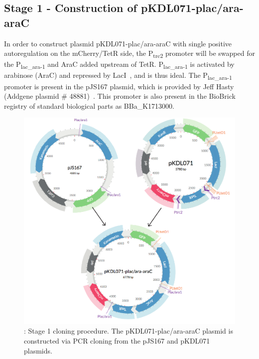 \subsection{Stage 1 - Construction of pKDL071-plac/ara-araC}

In order to construct plasmid pKDL071-plac/ara-araC with single positive autoregulation on the mCherry/TetR side, the P\textsubscript{trc2} promoter will be swapped for the P\textsubscript{lac\_ara-1} and AraC added upstream of TetR. P\textsubscript{lac\_ara-1} is activated by arabinose (AraC) and repressed by LacI~\autocite{Lutz:1997ti}, and is thus ideal. The P\textsubscript{lac\_ara-1} promoter is present in the pJS167 plasmid, which is provided by Jeff Hasty (Addgene plasmid \# 48881)~\autocite{Stricker:2008jqa}. This promoter is also present in the BioBrick registry of standard biological parts as BBa\_K1713000. 



\begin{figure}[t]
	\begin{center}
		\includegraphics[scale=0.7]{../../chapters/chapterDesignSwitches/images/stage1_cloning.pdf}
		\caption[LoF caption]{\label{fig:stage1}: Stage 1 cloning procedure. The pKDL071-plac/ara-araC plasmid is constructed via PCR cloning from the pJS167 and pKDL071 plasmids.}
	\end{center}
\end{figure}
\clearpage

